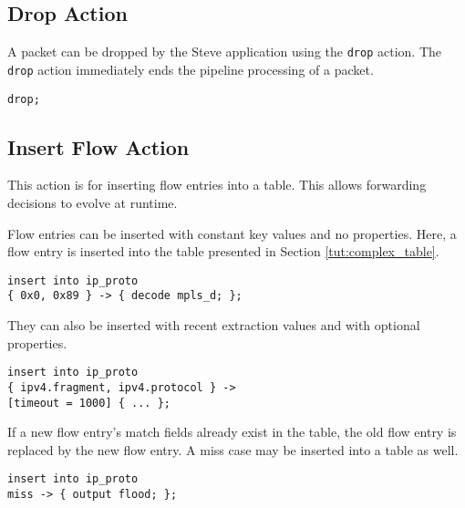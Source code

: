 \subsection{Drop Action} \label{tut:drop_action}

A packet can be dropped by the Steve application using the \texttt{drop} action.
The \texttt{drop} action immediately ends the pipeline processing of a packet.

\begin{codepage}
\begin{lstlisting}
drop;
\end{lstlisting}
\end{codepage}

\subsection{Insert Flow Action} \label{tut:insert_flow_action}

This action is for inserting flow entries into a table.
This allows forwarding decisions to evolve at runtime.

Flow entries can be inserted with constant key values and no properties. Here,
a flow entry is inserted into the table presented in Section
\ref{tut:complex_table}.

\begin{codepage}
\begin{lstlisting}
insert into ip_proto
{ 0x0, 0x89 } -> { decode mpls_d; };
\end{lstlisting}
\end{codepage}

They can also be inserted with recent extraction values and with
optional properties.

\begin{codepage}
\begin{lstlisting}
insert into ip_proto
{ ipv4.fragment, ipv4.protocol } ->
[timeout = 1000] { ... };
\end{lstlisting}
\end{codepage}

If a new flow entry's match fields already exist in the table, the old flow
entry is replaced by the new flow entry. A miss case may be inserted into a
table as well.

\begin{codepage}
\begin{lstlisting}
insert into ip_proto
miss -> { output flood; };
\end{lstlisting}
\end{codepage}

